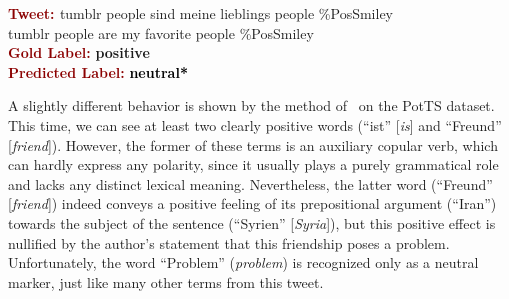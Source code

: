 \begin{example}\label{snt:cgsa:exmp:socher13-error}
  \noindent\textup{\bfseries\textcolor{darkred}{Tweet: }} {\upshape
    \colorbox{blue!1.4!white!5}{tumblr} \colorbox{white!19}{people} \colorbox{white!32}{sind} \colorbox{white!5}{meine} \colorbox{white!30}{lieblings} \colorbox{white!19}{people} \colorbox{white!8}{\%PosSmiley}}\\
  \noindent \colorbox{blue!1.4!white!5}{tumblr} \colorbox{white!19}{people} \colorbox{white!32}{are} \colorbox{white!5}{my} \colorbox{white!30}{favorite} \colorbox{white!19}{people} \colorbox{white!8}{\%PosSmiley}\\[\exampleSep]
  \noindent\textup{\bfseries\textcolor{darkred}{Gold Label:}}\hspace*{4.3em}\textbf{%
    \upshape\textcolor{green3}{positive}}\\
 \noindent\textup{\bfseries\textcolor{darkred}{Predicted Label:}}\hspace*{2em}\textbf{%
    \upshape\textcolor{black}{neutral*}}
\end{example}

A slightly different behavior is shown by the method
of~\citet{Severyn:15} on the PotTS dataset.  This time, we can see at
least two clearly positive words (``ist'' [\emph{is}] and ``Freund''
[\emph{friend}]).  However, the former of these terms is an auxiliary
copular verb, which can hardly express any polarity, since it usually
plays a purely grammatical role and lacks any distinct lexical
meaning.  Nevertheless, the latter word (``Freund'' [\emph{friend}])
indeed conveys a positive feeling of its prepositional argument
(``Iran'') towards the subject of the sentence (``Syrien''
[\emph{Syria}]), but this positive effect is nullified by the author's
statement that this friendship poses a problem. Unfortunately, the
word ``Problem'' (\emph{problem}) is recognized only as a neutral
marker, just like many other terms from this tweet.

